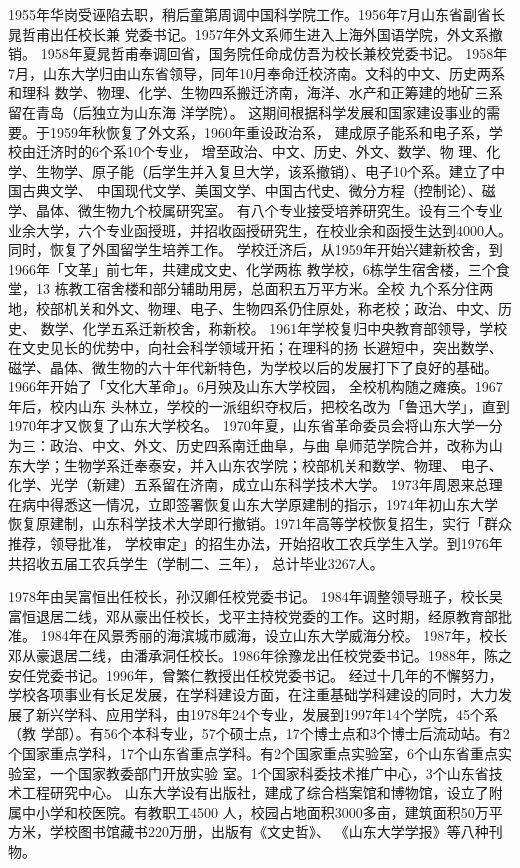 \documentclass[openany]{sduthesis} %
\begin{document}
1955年华岗受诬陷去职，稍后童第周调中国科学院工作。1956年7月山东省副省长晁哲甫出任校长兼 党委书记。1957年外文系师生进入上海外国语学院，外文系撤销。 1958年夏晁哲甫奉调回省，国务院任命成仿吾为校长兼校党委书记。 1958年7月，山东大学归由山东省领导，同年10月奉命迁校济南。文科的中文、历史两系和理科 数学、物理、化学、生物四系搬迁济南，海洋、水产和正筹建的地矿三系留在青岛（后独立为山东海 洋学院）。 这期间根据科学发展和国家建设事业的需要。于1959年秋恢复了外文系，1960年重设政治系， 建成原子能系和电子系，学校由迁济时的6个系10个专业， 增至政治、中文、历史、外文、数学、物 理、化学、生物学、原子能（后学生并入复旦大学，该系撤销）、电子10个系。建立了中国古典文学、 中国现代文学、美国文学、中国古代史、微分方程（控制论）、磁学、晶体、微生物九个校属研究室。 有八个专业接受培养研究生。设有三个专业业余大学，六个专业函授班，并招收函授研究生，在校业余和函授生达到4000人。同时，恢复了外国留学生培养工作。 学校迁济后，从1959年开始兴建新校舍，到1966年「文革」前七年，共建成文史、化学两栋 教学校，6栋学生宿舍楼，三个食堂，13 栋教工宿舍楼和部分辅助用房，总面积五万平方米。全校 九个系分住两地，校部机关和外文、物理、电子、生物四系仍住原处，称老校；政治、中文、历史、 数学、化学五系迁新校舍，称新校。 1961年学校复归中央教育部领导，学校在文史见长的优势中，向社会科学领域开拓；在理科的扬 长避短中，突出数学、磁学、晶体、微生物的六十年代新特色，为学校以后的发展打下了良好的基础。 1966年开始了「文化大革命」。6月殃及山东大学校园， 全校机构随之瘫痪。1967年后，校内山东 头林立，学校的一派组织夺权后，把校名改为「鲁迅大学」，直到1970年才又恢复了山东大学校名。 1970年夏，山东省革命委员会将山东大学一分为三：政治、中文、外文、历史四系南迁曲阜，与曲 阜师范学院合并，改称为山东大学；生物学系迁奉泰安，并入山东农学院；校部机关和数学、物理、 电子、化学、光学（新建）五系留在济南，成立山东科学技术大学。 1973年周恩来总理在病中得悉这一情况，立即签署恢复山东大学原建制的指示，1974年初山东大学 恢复原建制，山东科学技术大学即行撤销。1971年高等学校恢复招生，实行「群众推荐，领导批准， 学校审定」的招生办法，开始招收工农兵学生入学。到1976年共招收五届工农兵学生（学制二、三年）， 总计毕业3267人。

1978年由吴富恒出任校长，孙汉卿任校党委书记。 1984年调整领导班子，校长吴富恒退居二线，邓从豪出任校长，戈平主持校党委的工作。这时期，经原教育部批准。 1984年在风景秀丽的海滨城市威海，设立山东大学威海分校。 1987年，校长邓从豪退居二线，由潘承洞任校长。1986年徐豫龙出任校党委书记。1988年，陈之安任党委书记。1996年，曾繁仁教授出任校党委书记。 经过十几年的不懈努力，学校各项事业有长足发展，在学科建设方面，在注重基础学科建设的同时，大力发展了新兴学科、应用学科，由1978年24个专业，发展到1997年14个学院，45个系（教 学部）。有56个本科专业，57个硕士点，17个博士点和3个博士后流动站。有2个国家重点学科，17个山东省重点学科。有2个国家重点实验室，6个山东省重点实验室，一个国家教委部门开放实验 室。1个国家科委技术推广中心，3个山东省技术工程研究中心。 山东大学设有出版社，建成了综合档案馆和博物馆，设立了附属中小学和校医院。有教职工4500 人，校园占地面积3000多亩，建筑面积50万平方米，学校图书馆藏书220万册，出版有《文史哲》、 《山东大学学报》等八种刊物。
\end{document}
